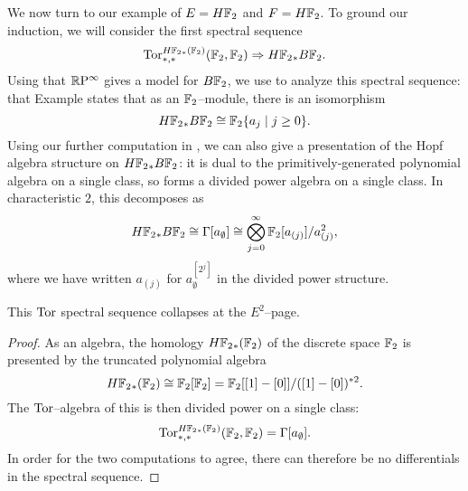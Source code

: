 We now turn to our example of $E = H\mathbb F_2$ and $F = H\mathbb F_2$.  To ground our induction, we will consider the first spectral sequence \[\operatorname{Tor}^{H\mathbb F_2{}_*(\mathbb F_2)}_{*, *}(\mathbb F_2, \mathbb F_2) \Rightarrow H\mathbb F_2{}_* B\mathbb F_2.\]  Using that $\mathbb R\mathrm P^\infty$ gives a model for $B\mathbb F_2$, we use  to analyze this spectral sequence: that Example states that as an $\mathbb F_2$--module, there is an isomorphism \[H\mathbb F_2{}_* B\mathbb F_2 \cong \mathbb F_2\{a_j \mid j \ge 0\}.\]  Using our further computation in , we can also give a presentation of the Hopf algebra structure on $H\mathbb F_2{}_* B\mathbb F_2$: it is dual to the primitively-generated polynomial algebra on a single class, so forms a divided power algebra on a single class.  In characteristic $2$, this decomposes as \[H\mathbb F_2{}_* B\mathbb F_2 \cong \Gamma[a_\emptyset] \cong \bigotimes_{j=0}^\infty \mathbb F_2[a_{(j)}] / a_{(j)}^2,\] where we have written $a_{(j)}$ for $a_\emptyset^{[2^j]}$ in the divided power structure.

\begin{corollary}
This $\operatorname{Tor}$ spectral sequence collapses at the $E^2$--page.
\end{corollary}
\begin{proof}
As an algebra, the homology $H\mathbb F_2{}_*(\mathbb F_2)$ of the discrete space $\mathbb F_2$ is presented by the truncated polynomial algebra \[H\mathbb F_2{}_*(\mathbb F_2) \cong \mathbb F_2[\mathbb F_2] = \mathbb F_2[[1] - [0]] / ([1] - [0])^{\ast 2}.\]  The $\operatorname{Tor}$--algebra of this is then divided power on a single class: \[\operatorname{Tor}^{H\mathbb F_2{}_*(\mathbb F_2)}_{*, *}(\mathbb F_2, \mathbb F_2) = \Gamma[a_\emptyset].\]  In order for the two computations to agree, there can therefore be no differentials in the spectral sequence.
\end{proof}

